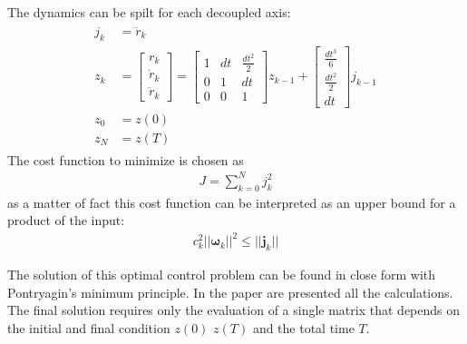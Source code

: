 The dynamics can be spilt  for each decoupled axis:
\begin{align}
\begin{split}
j_k &= \dddot{r}_k\\
z_k  &= 
{\begin{bmatrix}
 r_k \\[10pt]
 \dot{r}_k \\[10pt]
 \ddot{r}_k
\end{bmatrix}} = 
{\begin{bmatrix}
1 & dt & \frac{dt^2}{2}  \\[10pt]
0 & 1 & dt \\[10pt]
0 & 0 & 1
\end{bmatrix}}z_{k-1} + 
{\begin{bmatrix}
 \frac{dt^3}{6}  \\[10pt]
 \frac{dt^2}{2} \\[10pt]
 dt
\end{bmatrix}}j_{k-1} \\
z_0 &= z(0) \\
z_N &= z(T)
\end{split}
\end{align}
The cost function to minimize is chosen as
\begin{align}
J = \sum_{k=0}^N j_k^2
\end{align}
as a matter of fact this cost function can be interpreted as an upper bound for a product of the input:
\begin{align}
c_k^2||\boldsymbol{\omega}_k||^2 \leq ||\boldsymbol{j}_k||
\end{align}

The solution of this optimal control problem can be found in close form with Pontryagin's minimum principle.
In the paper \cite{mueller2015computationally} are presented all the calculations.\\
The final solution requires only the evaluation of a single matrix that depends on the initial and final condition $z(0)$ $z(T)$ and the total time $T$.

